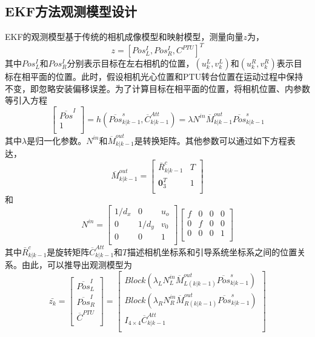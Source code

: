 \subsection{EKF方法观测模型设计}
EKF的观测模型基于传统的相机成像模型和映射模型，测量向量$z$为，
\begin{equation}
z=[Pos^I_L, Pos^I_R, C^{PTU}]^T
\end{equation} 
其中$Pos^I_L$和$Pos^I_R$分别表示目标在左右相机的位置，$(u^L_k, v^L_k)$和$(u^R_k, v^R_k)$表示目标在相平面的位置。此时，假设相机光心位置和PTU转台位置在运动过程中保持不变，即忽略安装偏移误差。为了计算目标在相平面的位置，将相机位置、内参数等引入方程
\begin{equation}
\left[\begin{matrix}
\overline{Pos}^I \\
1\\
\end{matrix}\right]
=h(\overline{Pos}^s_{k|k-1}, \overline{C}^{Att}_{k|k-1})
=\lambda N^{in}\overline{M}^{out}_{k|k-1}\overline{Pos}^s_{k|k-1}
\end{equation}
其中$\lambda$是归一化参数。$N^{in}$和$\overline{M}^{out}_{k|k-1}$是转换矩阵。其他参数可以通过如下方程表达，
\begin{equation}
\overline{M}^{out}_{k|k-1}
= \left[
\begin{matrix}
\bar{R}^c_{k|k-1} & T \\
\textbf{0}^T_3 & 1 \\
\end{matrix}
\right]
\end{equation}
和
\begin{equation}
N^{in}=
\left[
\begin{matrix}
1/d_x & 0 & u_o \\
0 & 1/d_y & v_0 \\
0 & 0 & 1 \\
\end{matrix}
\right]
\left[
\begin{matrix}
f & 0 & 0 & 0 \\
0 & f & 0 & 0 \\
0 & 0 & 0 & 1 \\
\end{matrix}
\right]
\end{equation}
其中$\bar{R}^c_{k|k-1}$是旋转矩阵$\overline{C}^{Att}_{k|k-1}$和$T$描述相机坐标系和引导系统坐标系之间的位置关系。由此，可以推导出观测模型为
\begin{equation}
\bar{z_k}=
\left[
\begin{matrix}
\overline{Pos}^I_L \\
\overline{Pos}^I_R \\
\overline{C}^{PTU} \\
\end{matrix}
\right]
=
\left[
\begin{matrix}
Block (\lambda_L N^{in}_L \overline{M}^{out}_{L(k|k-1)}\overline{Pos}^s_{k|k-1} )\\
Block (\lambda_R N^{in}_R\overline{M}^{out}_{R(k|k-1)}\overline{Pos}^s_{k|k-1}  )\\
I_{4 \times 4}\overline{C}^{Att}_{k|k-1} \\
\end{matrix}
\right]
\end{equation}
